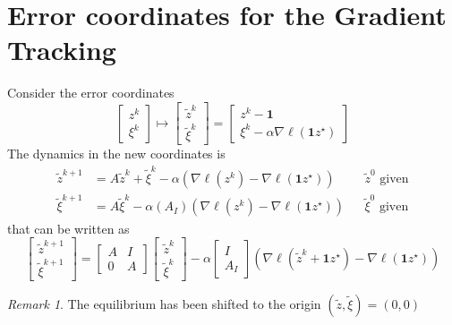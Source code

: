 \documentclass{book}
\newcommand{\fatone}{\boldsymbol{1}}
\newcommand{\fatl}{\boldsymbol{\ell}}
\theoremstyle{theoremv2}
\theoremstyle{defv2}
\theoremstyle{remark}
\newtheorem*{remark}{Remark}
\theoremstyle{remark}
\theoremstyle{definition}
\theoremstyle{definition}
\begin{document}
\section{Error coordinates for the Gradient Tracking}
Consider the error coordinates 
\[
    \begin{bmatrix}
        z^k \\ \xi^k
    \end{bmatrix} \mapsto \begin{bmatrix}
        \tilde{z}^k \\ \tilde{\xi}^k
    \end{bmatrix} = \begin{bmatrix}
        z^k - \fatone \\ \xi^k - \alpha\nabla\fatl(\fatone z^\star)
    \end{bmatrix}
\]
The dynamics in the new coordinates is 
\begin{align*}
    \tilde{z}^{k+1} &= A \tilde{z}^k + \tilde{\xi}^k - \alpha \left(\nabla\fatl(z^k)-\nabla\fatl(\fatone z^\star)\right) && \tilde{z}^0 \text{ given}\\
    \tilde{\xi}^{k+1} &= A \tilde{\xi}^k - \alpha (A_I)(\nabla\fatl(z^k)-\nabla\fatl(\fatone z^\star)) && \tilde{\xi}^0 \text{ given}
\end{align*}
that can be written as 
\[
    \begin{bmatrix}
        \tilde{z}^{k+1} \\ \tilde{\xi}^{k+1}
    \end{bmatrix} = \begin{bmatrix}
        A & I \\ 0 & A
    \end{bmatrix} \begin{bmatrix}
        \tilde{z}^{k} \\ \tilde{\xi}^{k}
    \end{bmatrix} - \alpha \begin{bmatrix}
        I \\ A_I
    \end{bmatrix} (\nabla\fatl(\tilde{z}^k+\fatone z^\star)-\nabla\fatl(\fatone z^\star))
\]
\begin{remark}
    The equilibrium has been shifted to the origin $(\tilde{z},\tilde{\xi}) = (0,0)$
\end{remark}
\end{document}
